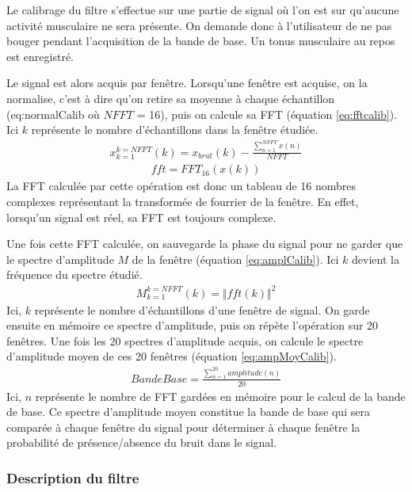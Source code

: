\documentclass[letterpaper, twoside, 12pt, memoire, creativecommons, hyperref]{thETS}
\begin{document}
Le calibrage du filtre s'effectue sur une partie de signal où l'on est sur qu'aucune activité musculaire ne sera présente. On demande donc à l'utilisateur de ne pas bouger pendant l'acquisition de la bande de base. Un tonus musculaire au repos est enregistré.

Le signal est alors acquis par fenêtre. Lorsqu'une fenêtre est acquise, on la normalise, c'est à dire qu'on retire sa moyenne à chaque échantillon (eq:normalCalib où $NFFT$ = 16), puis on calcule sa FFT (équation \ref{eq:fftcalib}). Ici $k$ représente le nombre d'échantillons dans la fenêtre étudiée.
\begin{align}\label{eq:normalCalib}
   x_{k=1}^{k=NFFT}(k) = x_{brut}(k) - \frac{\sum_{n=1}^{NFFT}x(n)}{NFFT}
\end{align}
\begin{align}\label{eq:fftcalib}
   fft = FFT_{16}(x(k)) 
\end{align}
La FFT calculée par cette opération est donc un tableau de 16 nombres complexes représentant la transformée de fourrier de la fenêtre. En effet, lorsqu'un signal est réel, sa FFT est toujours complexe.

Une fois cette FFT calculée, on sauvegarde la phase du signal pour ne garder que le spectre d'amplitude $M$ de la fenêtre (équation \ref{eq:amplCalib}). Ici $k$ devient la fréquence du spectre étudié.
\begin{align}\label{eq:amplCalib}
   M_{k=1}^{k=NFFT}(k) = \Vert fft(k) \Vert^2
\end{align}
Ici, $k$ représente le nombre d'échantillons d'une fenêtre de signal. On garde ensuite en mémoire ce spectre d'amplitude, puis on répète l'opération sur 20 fenêtres. Une fois les 20 spectres d'amplitude acquis, on calcule le spectre d'amplitude moyen de ces 20 fenêtres (équation \ref{eq:ampMoyCalib}).
\begin{align}\label{eq:ampMoyCalib}
   BandeBase = \frac{\sum_{n=1}^{20}amplitude(n)}{20}
\end{align}
Ici, $n$ représente le nombre de FFT gardées en mémoire pour le calcul de la bande de base. Ce spectre d'amplitude moyen constitue la bande de base qui sera comparée à chaque fenêtre du signal pour déterminer à chaque fenêtre la probabilité de présence/absence du bruit dans le signal.

\subsubsection{Description du filtre}
\end{document}

